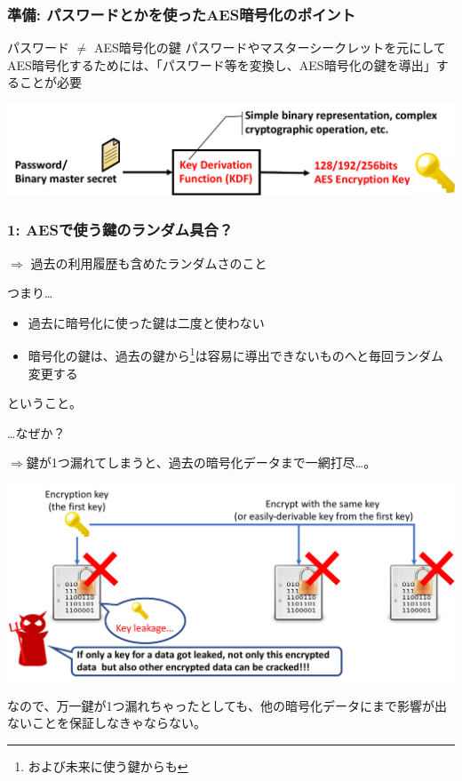 \documentclass[12pt,dvipdfmx]{beamer}
\begin{document}
\begin{frame}
\frametitle{準備: パスワードとかを使ったAES暗号化のポイント}
\begin{block}{\small パスワード $\neq$ AES暗号化の鍵}
パスワードやマスターシークレットを元にしてAES暗号化するためには、「パスワード等を変換し、AES暗号化の鍵を導出」することが必要
\end{block}
\begin{center}
\includegraphics[width=\linewidth]{Figs/kdf_definition.pdf}
\end{center}
\end{frame}

\begin{frame}
\frametitle{1: AESで使う鍵のランダム具合？}
$\Rightarrow$ \alert{過去の利用履歴も含めたランダムさ}のこと

\vspace{1ex}

\begin{block}{}
つまり…
\begin{itemize}
\item 過去に暗号化に使った鍵は\alert{二度と使わない}
\item 暗号化の鍵は、過去の鍵から\footnote[frame]{および未来に使う鍵からも}は容易に導出できないものへと\alert{毎回ランダム変更}する
\end{itemize}
ということ。
\end{block}

\end{frame}

\begin{frame}
…なぜか？

$\Rightarrow$鍵が1つ漏れてしまうと、過去の暗号化データまで一網打尽…。

\begin{center}
\includegraphics[width=0.9\linewidth]{Figs/pfs_bad_case.pdf}
\end{center}

\begin{block}{}
なので、万一鍵が1つ漏れちゃったとしても、他の暗号化データにまで影響が出ないことを保証しなきゃならない。
\end{block}

\end{frame}
\end{document}

